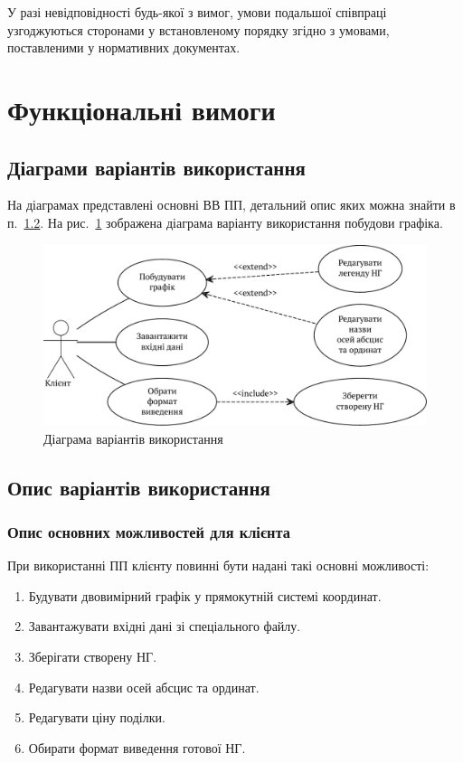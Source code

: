 \documentclass[a4paper,oneside,DIV=12,12pt]{scrartcl}
\begin{document}
			У разі невідповідності будь-якої з вимог, умови подальшої співпраці узгоджуються сторонами у встановленому порядку згідно з умовами, поставленими у нормативних документах.

	\section{Функціональні вимоги}
		\subsection{Діаграми варіантів використання}
		На діаграмах представлені основні ВВ ПП, детальний опис яких можна знайти в п.~\ref{ssec:use-case-description}. На рис.~\ref{fig:client-use-case-diagram} зображена діаграма варіанту використання побудови графіка.
		
		\begin{figure}[!htbp]
		\centering
			\includegraphics[width = \textwidth]{assets/use-case-diag-01.pdf}
		\caption{Діаграма варіантів використання}
		\label{fig:client-use-case-diagram}
		\end{figure}

		\subsection{Опис варіантів використання}
			\label{ssec:use-case-description}

		\subsubsection{Опис основних можливостей для клієнта}
		
			При використанні ПП клієнту повинні бути надані такі основні можливості:
			\begin{enumerate}
				\item Будувати двовимірний графік у прямокутній системі координат.
				\item Завантажувати вхідні дані зі спеціального файлу.
				\item Зберігати створену НГ.
				\item Редагувати назви осей абсцис та ординат.
				\item Редагувати ціну поділки.
				\item Обирати формат виведення готової НГ.
			\end{enumerate}
\end{document}
